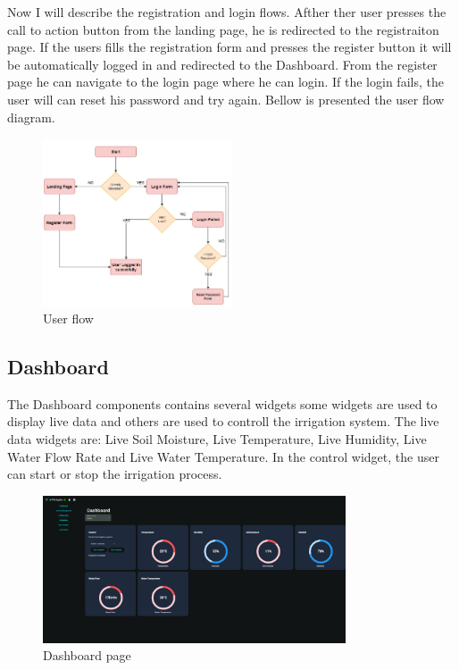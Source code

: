 Now I will describe the registration and login flows. Afther ther user presses the
call to action button from the landing page, he is redirected to the registraiton page. 
If the users fills the registration form and presses the register button it will be automatically
logged in and redirected to the Dashboard. From the register page he can navigate to the login page where
he can login. If the login fails, the user will can reset his password and try again.
Bellow is presented the user flow diagram.
\begin{figure}[H]
    \centering
    \includegraphics[width=0.5\textwidth]{images/user_flow.png}
    \caption{User flow}
    \label{fig:user-flow}
\end{figure}

\subsection{Dashboard}
The Dashboard components contains several widgets some widgets are used to display live data
and others are used to controll the irrigation system. 
The live data widgets are: Live Soil Moisture, Live Temperature, Live Humidity,
Live Water Flow Rate and Live Water Temperature. In the control widget, the user can
start or stop the irrigation process.

\begin{figure}[H]
    \centering
    \includegraphics[width=0.8\textwidth]{images/dashboard.png}
    \caption{Dashboard page}
    \label{fig:dashboard-page}
\end{figure}

